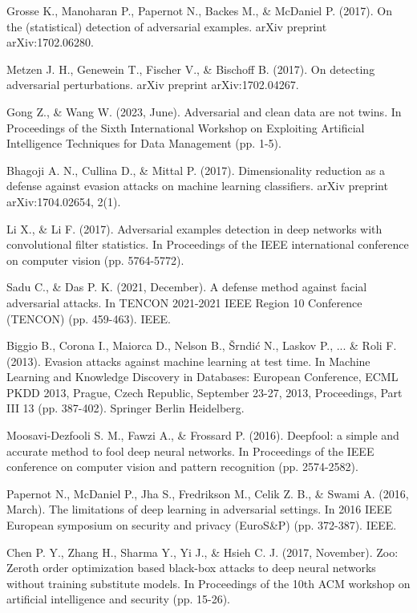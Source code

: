 \begin{thebibliography}{}
Grosse K., Manoharan P., Papernot N., Backes M., \& McDaniel P. (2017). On the (statistical) detection of adversarial examples. arXiv preprint arXiv:1702.06280.

Metzen J. H., Genewein T., Fischer V., \& Bischoff B. (2017). On detecting adversarial perturbations. arXiv preprint arXiv:1702.04267.

Gong Z., \& Wang W. (2023, June). Adversarial and clean data are not twins. In Proceedings of the Sixth International Workshop on Exploiting Artificial Intelligence Techniques for Data Management (pp. 1-5).

Bhagoji A. N., Cullina D., \& Mittal P. (2017). Dimensionality reduction as a defense against evasion attacks on machine learning classifiers. arXiv preprint arXiv:1704.02654, 2(1).

Li X., \& Li F. (2017). Adversarial examples detection in deep networks with convolutional filter statistics. In Proceedings of the IEEE international conference on computer vision (pp. 5764-5772).

Sadu C., \& Das P. K. (2021, December). A defense method against facial adversarial attacks. In TENCON 2021-2021 IEEE Region 10 Conference (TENCON) (pp. 459-463). IEEE.

Biggio B., Corona I., Maiorca D., Nelson B., Šrndić N., Laskov P., ... \& Roli F. (2013). Evasion attacks against machine learning at test time. In Machine Learning and Knowledge Discovery in Databases: European Conference, ECML PKDD 2013, Prague, Czech Republic, September 23-27, 2013, Proceedings, Part III 13 (pp. 387-402). Springer Berlin Heidelberg.

Moosavi-Dezfooli S. M., Fawzi A., \& Frossard P. (2016). Deepfool: a simple and accurate method to fool deep neural networks. In Proceedings of the IEEE conference on computer vision and pattern recognition (pp. 2574-2582).

Papernot N., McDaniel P., Jha S., Fredrikson M., Celik Z. B., \& Swami A. (2016, March). The limitations of deep learning in adversarial settings. In 2016 IEEE European symposium on security and privacy (EuroS\&P) (pp. 372-387). IEEE.

Chen P. Y., Zhang H., Sharma Y., Yi J., \& Hsieh C. J. (2017, November). Zoo: Zeroth order optimization based black-box attacks to deep neural networks without training substitute models. In Proceedings of the 10th ACM workshop on artificial intelligence and security (pp. 15-26).


\end{thebibliography}
